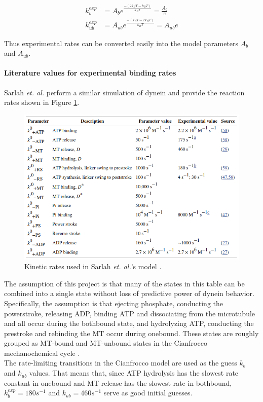 \documentclass[10pt]{article} %
\begin{document}
\begin{align*}
  k_b^{exp} &= A_be^{\frac{-\left(2k_BT - k_BT\right)}{k_BT}} = \frac{A_b}{e}\\
  k_{ub}^{exp} &= A_{ub}e^{\frac{-\left(k_BT-2k_BT\right)}{k_BT}} = A_{ub}e
\end{align*}

Thus experimental rates can be converted easily into the model parameters $A_b$ and $A_{ub}$.

\paragraph{Literature values for experimental binding rates}
Sarlah \textit{et. al.} \cite{sarlahmodel} perform a similar simulation of dynein and provide the reaction rates shown in Figure \ref{fig:sarlah-rate-table}.

\begin{figure}[h]
  \centering
  \includegraphics[width=.45\textwidth]{../../figures/SarlahParameterTable.png}
  \caption{Kinetic rates used in Sarlah \textit{et. al.}'s model \cite{sarlahmodel}.}
  \label{fig:sarlah-rate-table}
\end{figure}

The assumption of this project is that many of the states in this table can be combined into a single state without loss of predictive power of dynein behavior. Specifically, the assumption is that ejecting phosphate, conducting the powerstroke, releasing ADP, binding ATP and dissociating from the microtubule and all occur during the bothbound state, and hydrolyzing ATP, conducting the prestroke and rebinding the MT occur during onebound. These states are roughly grouped as MT-bound and MT-unbound states in the Cianfrocco mechanochemical cycle \cite{cianfroccoreview}.\\

The rate-limiting transitions in the Cianfrocco model are used as the guess $k_b$ and $k_{ub}$ values. That means that, since ATP hydrolysis has the slowest rate constant in onebound and MT release has the slowest rate in bothbound, $k_b^{exp} = 180 s^{-1}$ and $k_{ub} = 460 s^{-1}$ serve as good initial guesses.\\
\end{document}
